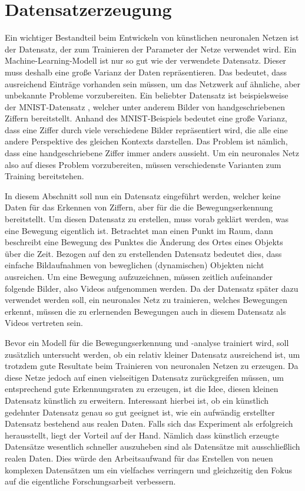 \chapter{Datensatzerzeugung}\label{chapter:dataset}
Ein wichtiger Bestandteil beim Entwickeln von künstlichen neuronalen Netzen ist
der Datensatz, der zum Trainieren der Parameter der Netze
verwendet wird. Ein Machine-Learning-Modell ist nur so gut wie der verwendete
Datensatz. Dieser muss deshalb eine große Varianz der Daten repräsentieren. Das
bedeutet, dass ausreichend Einträge vorhanden sein müssen, um das Netzwerk auf
ähnliche, aber unbekannte Probleme vorzubereiten. Ein beliebter Datensatz ist
beispielsweise der MNIST-Datensatz \cite{6296535}, welcher unter anderem Bilder
von handgeschriebenen Ziffern bereitstellt. Anhand des MNIST-Beispiels bedeutet
eine große Varianz, dass eine Ziffer durch viele verschiedene Bilder
repräsentiert wird, die alle eine andere Perspektive des gleichen Kontexts
darstellen. Das Problem ist nämlich, dass eine handgeschriebene Ziffer immer anders aussieht. Um ein neuronales Netz also auf dieses Problem vorzubereiten, müssen verschiedenste Varianten zum Training bereitstehen.

In diesem Abschnitt soll nun ein Datensatz eingeführt werden, welcher keine
Daten für das Erkennen von Ziffern, aber für die die Bewegungserkennung
bereitstellt. Um diesen Datensatz zu erstellen, muss vorab geklärt werden, was
eine Bewegung eigentlich ist. Betrachtet man einen Punkt im Raum, dann
beschreibt eine Bewegung des Punktes die Änderung des Ortes eines Objekts über
die Zeit.  Bezogen auf den zu erstellenden Datensatz bedeutet dies, dass
einfache Bildaufnahmen von beweglichen (dynamischen) Objekten nicht ausreichen.
Um eine Bewegung aufzuzeichnen, müssen zeitlich aufeinander folgende Bilder, also Videos aufgenommen werden. Da der Datensatz später
dazu verwendet werden soll, ein neuronales Netz zu trainieren, welches
Bewegungen erkennt, müssen die zu erlernenden Bewegungen auch in diesem
Datensatz als Videos vertreten sein.

Bevor ein Modell für die Bewegungserkennung und -analyse trainiert wird, soll
zusätzlich untersucht werden, ob ein relativ kleiner Datensatz ausreichend ist,
um trotzdem gute Resultate beim Trainieren von neuronalen Netzen zu erzeugen. Da
diese Netze jedoch auf einen vielseitigen Datensatz zurückgreifen müssen, um
entsprechend gute Erkennungsraten zu erzeugen, ist die Idee, diesen kleinen
Datensatz künstlich zu erweitern. Interessant hierbei ist, ob ein künstlich
gedehnter Datensatz genau so gut geeignet ist, wie ein aufwändig erstellter
Datensatz bestehend aus realen Daten. Falls sich das Experiment als erfolgreich
herausstellt, liegt der Vorteil auf der Hand. Nämlich dass künstlich erzeugte
Datensätze wesentlich schneller auszuheben sind als Datensätze mit
ausschließlich realen Daten. Dies würde den Arbeitsaufwand für das Erstellen von
neuen komplexen Datensätzen um ein vielfaches verringern und gleichzeitig den
Fokus auf die eigentliche Forschungsarbeit verbessern.

